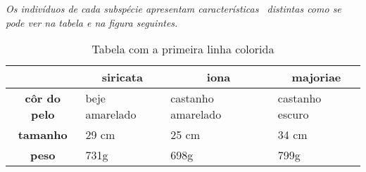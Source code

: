 \documentclass[a4paper,11pt]{report}
\begin{document}
	\textit{Os indivíduos de cada subspécie apresentam características \
	distintas como se pode ver na tabela e na figura seguintes.}

	\begin{table}[]
		\begin{tabular}{|c|l|l|l|}
			\hline 
			\rowcolor{gray!40}
			\multicolumn{1}{|l|}{} &
			\multicolumn{1}{c|}{\textbf{siricata}} &
			\multicolumn{1}{c|}{\textbf{iona}} &
			\multicolumn{1}{c|}{\textbf{majoriae}} \\ \hline
			\textbf{côr do pelo} & beje amarelado & castanho amarelado & castanho escuro \\ \hline
			\textbf{tamanho}     & 29 cm          & 25 cm              & 34 cm           \\ \hline
			\textbf{peso}        & 731g           & 698g               & 799g            \\ \hline
		\end{tabular}
		\caption{Tabela com a primeira linha colorida}
	\end{table}
\end{document}
